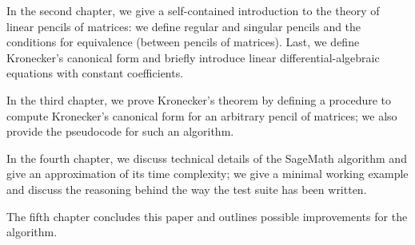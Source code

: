 In the second chapter, we give a self-contained introduction to the theory of linear pencils of matrices: we
define regular and singular pencils and the conditions for equivalence (between pencils of matrices). Last, we
define Kronecker's canonical form and briefly introduce linear differential-algebraic equations with constant
coefficients.

In the third chapter, we prove Kronecker's theorem by defining a procedure to compute Kronecker's canonical form
for an arbitrary pencil of matrices; we also provide the pseudocode for such an algorithm.

In the fourth chapter, we discuss technical details of the SageMath algorithm and
give an approximation of its time complexity; we give a minimal working example and discuss the reasoning behind the way
the test suite has been written.

The fifth chapter concludes this paper and outlines possible improvements for the algorithm.